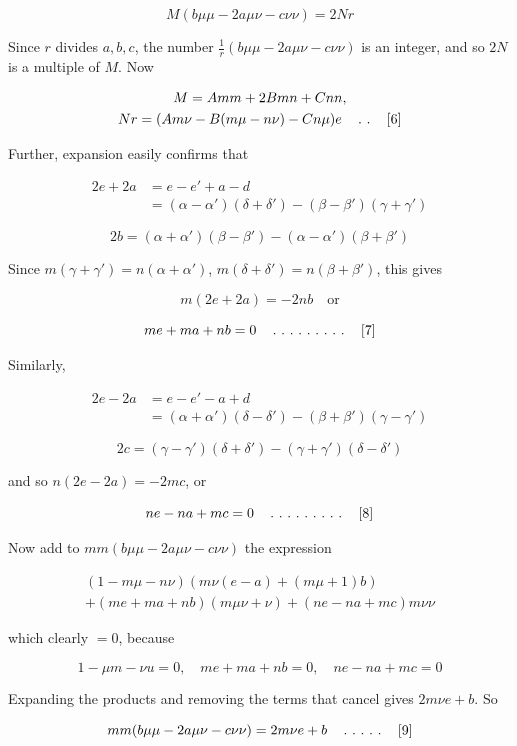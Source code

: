\[
M(b\mu\mu-2a\mu\nu-c\nu\nu)=2Nr
\]

Since $r$ divides $a,b,c$, the number $\frac{1}{r}(b\mu\mu-2a\mu\nu-c\nu\nu)$ is an integer, and so $2N$ is a multiple of $M$. Now

\[
\begin{gathered}M=Amm+2Bmn+Cnn,\\Nr=(Am\nu-B(m\mu-n\nu)-Cn\mu)e\quad\mathinner{.\ .}\quad[6]\end{gathered}
\]

Further, expansion easily confirms that

\[
\begin{aligned}2e+2a&=e-e'+a-d\\&=(\alpha-\alpha')(\delta+\delta')-(\beta-\beta')(\gamma+\gamma')\end{aligned}
\]

\[
2b=(\alpha+\alpha')(\beta-\beta')-(\alpha-\alpha')(\beta+\beta')
\]

Since $m(\gamma+\gamma')=n(\alpha+\alpha')$, $m(\delta+\delta')=n(\beta+\beta')$, this gives

\[
m(2e+2a)=-2nb\quad\text{or}
\]

\[
me+ma+nb=0\quad\mathinner{.\ .\ .\ .\ .\ .\ .\ .\ .}\quad[7]
\]

Similarly,

\[
\begin{aligned}2e-2a&=e-e'-a+d\\&=(\alpha+\alpha')(\delta-\delta')-(\beta+\beta')(\gamma-\gamma')\end{aligned}
\]

\[
2c=(\gamma-\gamma')(\delta+\delta')-(\gamma+\gamma')(\delta-\delta')
\]

and so $n(2e-2a)=-2mc$, or

\[
ne-na+mc=0\quad\mathinner{.\ .\ .\ .\ .\ .\ .\ .\ .}\quad[8]
\]

Now add to $mm(b\mu\mu-2a\mu\nu-c\nu\nu)$ the expression

\[
\begin{gathered}(1-m\mu-n\nu)(m\nu(e-a)+(m\mu+1)b)\\+(me+ma+nb)(m\mu\nu+\nu)+(ne-na+mc)m\nu\nu\end{gathered}
\]

which clearly $=0$, because

\[
1-\mu m-\nu u=0,\quad me+ma+nb=0,\quad ne-na+mc=0
\]

Expanding the products and removing the terms that cancel gives $2m\nu e+b$. So

\[
mm(b\mu\mu-2a\mu\nu-c\nu\nu)=2m\nu e+b\quad\mathinner{.\ .\ .\ .\ .}\quad[9]
\]

